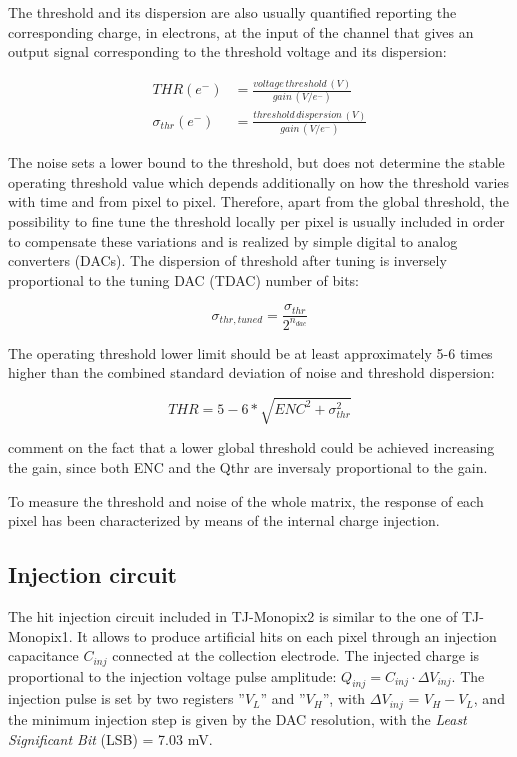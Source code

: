 The threshold and its dispersion are also usually quantified reporting the corresponding charge, in electrons, at the input of the channel that gives an output signal corresponding to the threshold voltage and its dispersion:

\begin{align}
THR (e^{-}) & = \frac{voltage \, threshold \, (V)}{gain \, (V/e^{-})} \label{eq:th_gain} \\
\sigma_{thr} (e^{-})    & = \frac{threshold \, dispersion \, (V)}{gain \, (V/e^{-})} 
\label{eq:disp_gain}
\end{align}

The noise sets a lower bound to the threshold, but does not determine the stable operating threshold value which depends additionally on how the threshold varies with time and from pixel to pixel. 
Therefore, apart from the global threshold, the possibility to fine tune the threshold locally per pixel is usually included in order to compensate these variations and is realized by simple digital to analog converters (DACs). The dispersion of threshold after tuning is inversely proportional to the tuning DAC (TDAC) number of bits:

\begin{equation}
\sigma_{thr,tuned} = \frac{\sigma_{thr}}{2^{n_{dac}}}
\end{equation}

The operating threshold lower limit should be at least approximately 5-6 times higher than the combined standard deviation of noise and threshold dispersion:

\begin{equation}
THR=5-6 *\sqrt{ENC^{2} + \sigma_{thr}^{2}}
\end{equation}

comment on the fact that a lower global threshold could be achieved increasing the gain, since both ENC and the Qthr are inversaly proportional to the gain. 

To measure the threshold and noise of the whole matrix, the response of each pixel has been characterized by means of the internal charge injection. \\

\subsection{Injection circuit} 
\label{inj_circuit_subsection}

The hit injection circuit included in TJ-Monopix2 is similar to the one of TJ-Monopix1. 
It allows to produce artificial hits on each pixel through an injection capacitance \textbf{$C_{inj}$} connected at the collection electrode. The injected charge is proportional to the injection voltage pulse amplitude: $Q_{inj} = C_{inj} \cdot \Delta V_{inj}$. The injection pulse is set by two registers ''\textbf{$V_{L}$}'' and ''\textbf{$V_{H}$}'', with $\Delta V_{inj}$ = \textbf{$V_{H}-V_{L}$}, and the minimum injection step is given by the DAC resolution, with the \textit{Least Significant Bit} (LSB) = 7.03 mV. 

